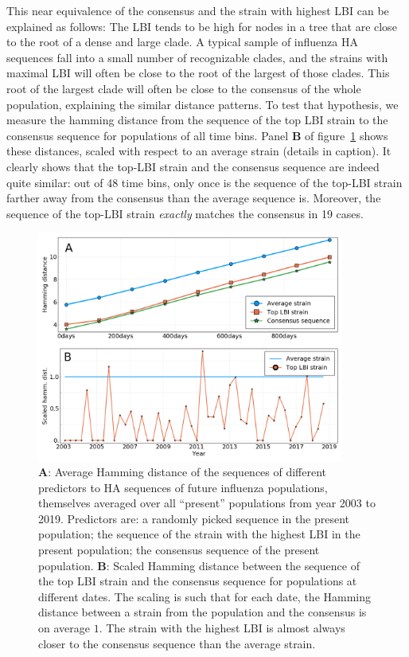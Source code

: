 \documentclass[reprint,amsmath,amssymb,superscriptaddress,showpacs,rmp]{revtex4-1}
\begin{document}
This near equivalence of the consensus and the strain with highest LBI can be explained as follows:
The LBI tends to be high for nodes in a tree that are close to the root of a dense and large clade.
A typical sample of influenza HA sequences fall into a small number of recognizable clades, and the strains with maximal LBI will often be close to the root of the largest of those clades.
This root of the largest clade will often be close to the consensus of the whole population, explaining the similar distance patterns.
To test that hypothesis, we measure the hamming distance from the sequence of the top LBI strain to the consensus sequence for populations of all time bins.
Panel \textbf{B} of figure~\ref{fig:LBI_consensus} shows these distances, scaled with respect to an average strain (details in caption). It clearly shows that the top-LBI strain and the consensus sequence are indeed quite similar: out of 48 time bins, only once is the sequence of the top-LBI strain farther away from the consensus than the average sequence is. Moreover, the sequence of the top-LBI strain \emph{exactly} matches the consensus in 19 cases.

\begin{figure}
	\centering
	\includegraphics[width=0.9\textwidth]{./Figures/Panel4.png}
	\caption{\textbf{A}: Average Hamming distance of the sequences of different predictors to HA sequences of future influenza populations, themselves averaged over all ``present'' populations from year 2003 to 2019. Predictors are: a randomly picked sequence in the present population; the sequence of the strain with the highest LBI in the present population; the consensus sequence of the present population. \textbf{B}: Scaled Hamming distance between the sequence of the top LBI strain and the consensus sequence for populations at different dates. The scaling is such that for each date, the Hamming distance between a strain from the population and the consensus is on average $1$. The strain with the highest LBI is almost always closer to the consensus sequence than the average strain.}
	\label{fig:LBI_consensus}
\end{figure}
\end{document}
